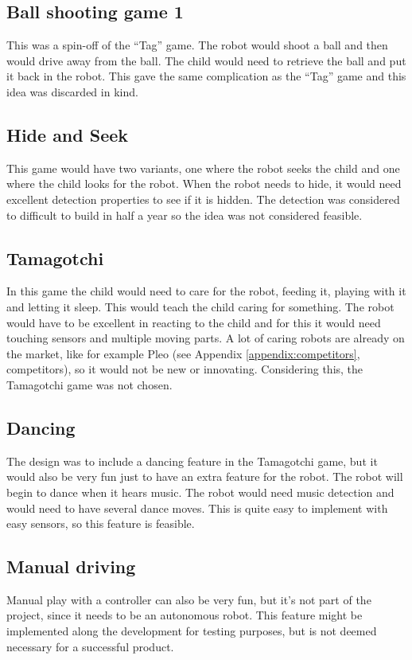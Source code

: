\documentclass[11pt,twoside,a4paper]{report}
\begin{document}
\subsection{Ball shooting game 1}
This was a spin-off of the “Tag” game. The robot would shoot a ball and then would drive away from the ball. The child would need to retrieve the ball and put it back in the robot. This gave the same complication as the “Tag” game and this idea was discarded in kind.
\subsection{Hide and Seek}
This game would have two variants, one where the robot seeks the child and one where the child looks for the robot. When the robot needs to hide, it would need excellent detection properties to see if it is hidden. The detection was considered to difficult to build in half a year so the idea was not considered feasible.
\subsection{Tamagotchi}
In this game the child would need to care for the robot, feeding it, playing with it and letting it sleep. This would teach the child caring for something. The robot would have to be excellent in reacting to the child and for this it would need touching sensors and multiple moving parts. A lot of caring robots are already on the market, like for example Pleo (see Appendix \ref{appendix:competitors}, competitors), so it would not be new or innovating. Considering this, the Tamagotchi game was not chosen.
\subsection{Dancing}
The design was to include a dancing feature in the Tamagotchi game, but it would also be very fun just to have an extra feature for the robot. The robot will begin to dance when it hears music. The robot would need music detection and would need to have several dance moves. This is quite easy to implement with easy sensors, so this feature is feasible.
\subsection{Manual driving}
Manual play with a controller can also be very fun, but it’s not part of the project, since it needs to be an autonomous robot. This feature might be implemented along the development for testing purposes, but is not deemed necessary for a successful product.
\end{document}

